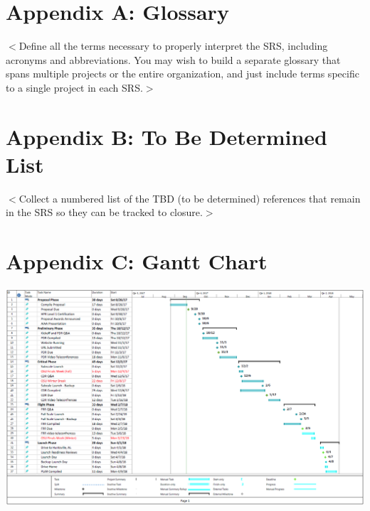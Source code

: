 \documentclass{scrreprt}
\begin{document}

\section{Appendix A: Glossary}
$<$Define all the terms necessary to properly interpret the SRS, including 
acronyms and abbreviations. You may wish to build a separate glossary that spans 
multiple projects or the entire organization, and just include terms specific to 
a single project in each SRS.$>$

\section{Appendix B: To Be Determined List}
$<$Collect a numbered list of the TBD (to be determined) references that remain 
in the SRS so they can be tracked to closure.$>$

\section{Appendix C: Gantt Chart}
\includegraphics{GanttChart}
\end{document}
